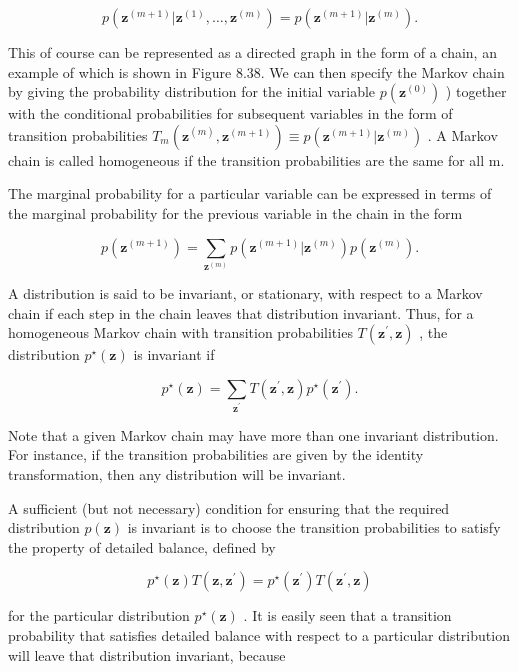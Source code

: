 \documentclass[
  10
]{article}
\begin{document}
\[
p (\mathbf {z} ^ {(m + 1)} | \mathbf {z} ^ {(1)}, \dots , \mathbf {z} ^ {(m)}) = p (\mathbf {z} ^ {(m + 1)} | \mathbf {z} ^ {(m)}).\tag{11.37}
\]

This of course can be represented as a directed graph in the form of a
chain, an example of which is shown in Figure 8.38. We can then specify
the Markov chain by giving the probability distribution for the initial
variable \(p ( \mathbf { z } ^ { ( 0 ) } )\) ) together with the
conditional probabilities for subsequent variables in the form of
transition probabilities
\(T _ { m } ( \mathbf { z } ^ { ( \hat { m } ) } , \mathbf { z } ^ { ( m + 1 ) } ) \equiv p ( \mathbf { z } ^ { ( m + 1 ) } | \mathbf { z } ^ { ( m ) } )\)
. A Markov chain is called homogeneous if the transition probabilities
are the same for all m.

The marginal probability for a particular variable can be expressed in
terms of the marginal probability for the previous variable in the chain
in the form

\[
p (\mathbf {z} ^ {(m + 1)}) = \sum_ {\mathbf {z} ^ {(m)}} p (\mathbf {z} ^ {(m + 1)} | \mathbf {z} ^ {(m)}) p (\mathbf {z} ^ {(m)}).\tag{11.38}
\]

A distribution is said to be invariant, or stationary, with respect to a
Markov chain if each step in the chain leaves that distribution
invariant. Thus, for a homogeneous Markov chain with transition
probabilities \(T ( \mathbf { z } ^ { \prime } , \mathbf { z } )\) , the
distribution \(p ^ { \star } ( \mathbf { z } )\) is invariant if

\[
p ^ {\star} (\mathbf {z}) = \sum_ {\mathbf {z} ^ {\prime}} T (\mathbf {z} ^ {\prime}, \mathbf {z}) p ^ {\star} (\mathbf {z} ^ {\prime}).\tag{11.39}
\]

Note that a given Markov chain may have more than one invariant
distribution. For instance, if the transition probabilities are given by
the identity transformation, then any distribution will be invariant.

A sufficient (but not necessary) condition for ensuring that the
required distribution \(p ( \mathbf { z } )\) is invariant is to choose
the transition probabilities to satisfy the property of detailed
balance, defined by

\[
p ^ {\star} (\mathbf {z}) T (\mathbf {z}, \mathbf {z} ^ {\prime}) = p ^ {\star} (\mathbf {z} ^ {\prime}) T (\mathbf {z} ^ {\prime}, \mathbf {z})\tag{11.40}
\]

for the particular distribution \(p ^ { \star } ( \mathbf { z } )\) . It
is easily seen that a transition probability that satisfies detailed
balance with respect to a particular distribution will leave that
distribution invariant, because
\end{document}
